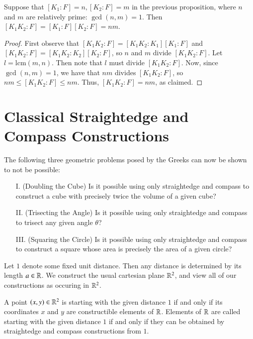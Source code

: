 \begin{corollary}
    Suppose that $[K_1:F]=n, [K_2:F]=m$ in the previous proposition, where $n$ and $m$ are relatively prime: $\gcd(n,m) = 1$. Then $[K_1K_2:F] = [K_1:F][K_2:F] = nm$.
\end{corollary}
\begin{proof}
    First observe that $[K_1K_2:F] = [K_1K_2:K_1][K_1:F]$ and $[K_1K_2:F] = [K_1K_2:K_2][K_2:F]$, so $n$ and $m$ divide $[K_1K_2:F]$. Let $l = \text{lcm}(m,n)$. Then note that $l$ must divide $[K_1K_2:F]$. Now, since $\gcd(n,m) = 1$, we have that $nm$ divides $[K_1K_2:F]$, so $nm \leq [K_1K_2:F] \leq nm$. Thus, $[K_1K_2:F] = nm$, as claimed.
\end{proof}





\section{ Classical Straightedge and Compass Constructions}

The following three geometric problems posed by the Greeks can now be shown to not be possible: 
\begin{enumerate}
    \item[I.] (Doubling the Cube) Is it possible using only straightedge and compass to construct a cube with precisely twice the volume of a given cube?
    \item[II.] (Trisecting the Angle) Is it possible using only straightedge and compass to trisect any given angle $\theta$?
    \item[III.] (Squaring the Circle) Is it possible using only straightedge and compass to construct a square whose area is precisely the area of a given circle?
\end{enumerate}

Let $1$ denote some fixed unit distance. Then any distance is determined by its length $a \in \mathbb R$. We construct the usual cartesian plane $\mathbb R^2$, and view all of our constructions as occuring in $\mathbb R^2$. 

\begin{definition}
    A point $(x,y) \in \mathbb R^2$ is  starting with the given distance $1$ if and only if its coordinates $x$ and $y$ are constructible elements of $\mathbb R$. Elements of $\mathbb R$ are called  starting with the given distance $1$ if and only if they can be obtained by straightedge and compass constructions from $1$.
\end{definition}

